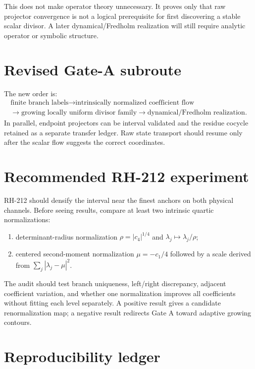 \documentclass[12pt]{article}
\theoremstyle{remark}\newtheorem{remark}[theorem]{Remark}
\begin{document}
This does not make operator theory unnecessary.  It proves only that raw
projector convergence is not a logical prerequisite for first discovering a
stable scalar divisor.  A later dynamical/Fredholm realization will still
require analytic operator or symbolic structure.

\section{Revised Gate-A subroute}

The new order is:
\begin{equation}\label{eq:route}
 \begin{gathered}
 \text{finite branch labels}
 \longrightarrow\text{intrinsically normalized coefficient flow}\\
 \longrightarrow\text{growing locally uniform divisor family}
 \longrightarrow\text{dynamical/Fredholm realization}.
 \end{gathered}
\end{equation}
In parallel, endpoint projectors can be interval validated and the residue
cocycle retained as a separate transfer ledger.  Raw state transport should
resume only after the scalar flow suggests the correct coordinates.

\section{Recommended RH-212 experiment}

RH-212 should densify the interval near the finest anchors on both physical
channels.  Before seeing results, compare at least two intrinsic quartic
normalizations:
\begin{enumerate}[leftmargin=2em]
\item determinant-radius normalization
$\rho=|c_4|^{1/4}$ and $\lambda_j\mapsto\lambda_j/\rho$;
\item centered second-moment normalization
$\mu=-c_1/4$ followed by a scale derived from
$\sum_j|\lambda_j-\mu|^2$.
\end{enumerate}
The audit should test branch uniqueness, left/right discrepancy, adjacent
coefficient variation, and whether one normalization improves all
coefficients without fitting each level separately.  A positive result gives
a candidate renormalization map; a negative result redirects Gate A toward
adaptive growing contours.

\section{Reproducibility ledger}
\end{document}
